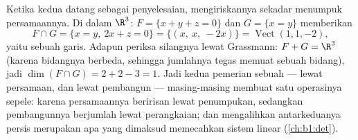 \begin{example}
\label{ex:b1:findim:intersectequations}
Ketika kedua  datang sebagai  penyelesaian, mengiriskannya sekadar
menumpuk persamaannya. Di dalam $\R^3$: $F = \{x + y + z = 0\}$ dan
$G = \{x = y\}$ memberikan
\[
F \cap G = \{x = y,\ 2x + z = 0\}
= \{(x,\ x,\ -2x)\} = \operatorname{Vect}(1, 1, -2),
\]
yaitu sebuah garis. Adapun periksa silangnya lewat Grassmann: $F + G = \R^3$ (karena bidangnya
berbeda, sehingga jumlahnya tegas memuat sebuah bidang), jadi
$\dim(F\cap G) = 2 + 2 - 3 = 1$. Jadi kedua pemerian sebuah
 --- lewat persamaan, dan lewat pembangun --- masing-masing membuat satu
operasinya sepele: karena persamaannya beririsan lewat penumpukan, sedangkan pembangunnya
berjumlah lewat perangkaian; dan mengalihkan antarkeduanya persis merupakan apa yang
dimaksud memecahkan sistem linear (\cref{ch:b1:det}).
\end{example}

